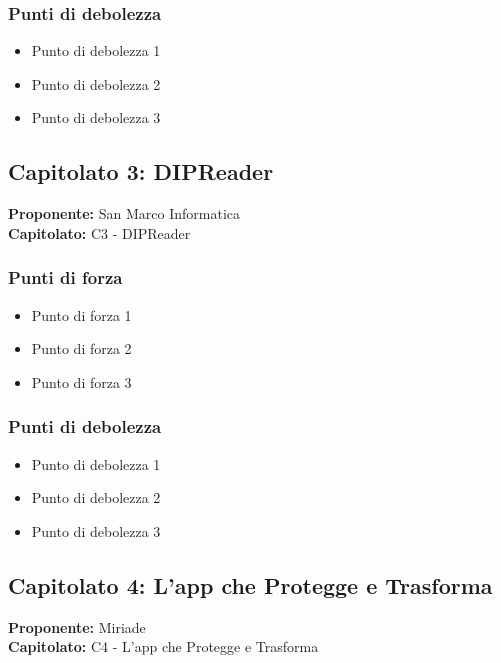 \documentclass[a4paper,12pt]{article}
\begin{document}
\subsubsection{Punti di debolezza}
\begin{itemize}
\item Punto di debolezza 1
\item Punto di debolezza 2
\item Punto di debolezza 3
\end{itemize}

\subsection{Capitolato 3: DIPReader}

\begin{tcolorbox}[colback=lightgray!30,colframe=darkgray,arc=2mm,boxrule=0.3pt]
\textbf{Proponente:} San Marco Informatica \\
\textbf{Capitolato:} C3 - DIPReader
\end{tcolorbox}

\subsubsection{Punti di forza}
\begin{itemize}
\item Punto di forza 1
\item Punto di forza 2
\item Punto di forza 3
\end{itemize}

\subsubsection{Punti di debolezza}
\begin{itemize}
\item Punto di debolezza 1
\item Punto di debolezza 2
\item Punto di debolezza 3
\end{itemize}

\subsection{Capitolato 4: L'app che Protegge e Trasforma}

\begin{tcolorbox}[colback=lightgray!30,colframe=darkgray,arc=2mm,boxrule=0.3pt]
\textbf{Proponente:} Miriade \\
\textbf{Capitolato:} C4 - L'app che Protegge e Trasforma
\end{tcolorbox}
\end{document}
